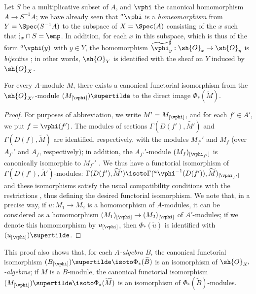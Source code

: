 \begin{example}[1.6.2]
\label{I.1.6.2}
Let $S$ be a multiplicative subset of $A$, and $\vphi$ the canonical homomorphism $A\to S^{-1}A$;
we have already seen  that ${}^a\vphi$ is a \emph{homeomorphism} from $Y=\Spec(S^{-1}A)$ to the subspace of $X=\Spec(A)$ consisting of the $x$ such that $\mathfrak{j}_x\cap S=\emp$.
In addition, for each $x$ in this subspace, which is thus of the form ${}^a\vphi(y)$ with $y\in Y$, the homomorphism $\widetilde{\vphi}_y^\sharp:\sh{O}_x\to\sh{O}_y$ is
\emph{bijective} ;
in other words, $\sh{O}_Y$ is identified with the sheaf on $Y$ induced by $\sh{O}_X$.
\end{example}

\begin{proposition}[1.6.3]
\label{I.1.6.3}
For every $A$-module $M$, there exists a canonical functorial isomorphism from the $\sh{O}_{X'}$-module $(M_{[\vphi]})\supertilde$ to the direct image $\Phi_*(\widetilde{M})$.
\end{proposition}

\begin{proof}
For purposes of abbreviation, we write $M'=M_{[\vphi]}$, and for each $f'\in A'$, we put $f=\vphi(f')$.
The modules of sections $\Gamma(D(f'),\widetilde{M'})$ and $\Gamma(D(f),\widetilde{M})$ are identified, respectively, with the modules $M_{f'}'$ and $M_f$ (over $A_{f'}'$ and $A_f$, respectively);
in addition, the $A_{f'}'$-module $(M_f)_{[\vphi_{f'}]}$ is canonically isomorphic to $M_{f'}'$ .
We thus have a functorial isomorphism of $\Gamma(D(f'),\widetilde{A'})$-modules: $\Gamma(D(f'),\widetilde{M'}) \isoto\Gamma({}^a\vphi^{-1}(D(f')),\widetilde{M})_{[\vphi_{f'}]}$ and these isomorphisms satisfy the usual compatibility conditions with the restrictions , thus defining the desired functorial isomorphism.
We note that, in a precise way, if $u:M_1\to M_2$ is a homomorphism of $A$-modules, it can be considered as a homomorphism $(M_1)_{[\vphi]}\to(M_2)_{[\vphi]}$ of $A'$-modules;
if we denote this homomorphism by $u_{[\vphi]}$, then $\Phi_*(\widetilde{u})$ is identified with $(u_{[\vphi]})\supertilde$.
\end{proof}

This proof also shows that, for each \emph{$A$-algebra $B$}, the canonical functorial isomorphism
$(B_{[\vphi]})\supertilde\isoto\Phi_*(\widetilde{B})$ is an isomorphism of \emph{$\sh{O}_{X'}$-algebras};
if $M$ is a $B$-module, the canonical functorial isomorphism $(M_{[\vphi]})\supertilde\isoto\Phi_*(\widetilde{M})$ is an isomorphism of $\Phi_*(\widetilde{B})$-modules.

